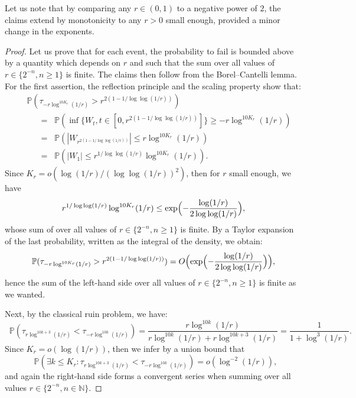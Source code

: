 \documentclass[british, a4paper,11pt]{article}
\numberwithin{equation}{section}
\theoremstyle{definition}
\renewcommand{\P}{\mathop{}\!\mathbb{P}}
\newcommand{\N}{\mathbb{N}}
\begin{document}
Let us note that by comparing any $r \in (0,1)$ to a negative power of $2$, the claims extend by monotonicity to any $r>0$ small enough, provided a minor change in the exponents.

\begin{proof}
Let us prove that for each event, the probability to fail is bounded above by a quantity which depends on $r$ and such that the sum over all values of $r \in \{2^{-n}, n \geq 1\}$ is finite. The claims then follow from the Borel--Cantelli lemma.
For the first assertion, the reflection principle and the scaling property show that:
\begin{align*}
&\P(\tau_{-r \log^{10 K_{r}}(1/r)} > r^{2(1-1/\log\log(1/r))})\\
& \qquad = \P(\inf\{W_t, t \in [0, r^{2(1-1/\log\log(1/r))}]\} \geq -r \log^{10 K_{r}}(1/r))
\\
& \qquad= \P(|W_{r^{2(1-1/\log\log(1/r))}}| \leq r \log^{10 K_{r}}(1/r)) 
\\
&\qquad= \P(|W_{1}| \leq r^{1/\log\log(1/r)} \log^{10 K_{r}}(1/r)) 
.\end{align*}
Since $K_r = o(\log(1/r)/(\log\log(1/r))^2)$, then for $r$ small enough, we have
\[r^{1/\log\log(1/r)} \log^{10 K_{r}}(1/r)
\leq \exp\Bigl(- \frac{\log(1/r)}{2 \log\log(1/r)}\Bigr)
,\]
whose sum of over all values of $r \in \{2^{-n}, n \geq 1\}$ is finite.
By a Taylor expansion of the last probability, written as the integral of the density, we obtain:
\[\P(\tau_{-r \log^{10 K_{r}}(1/r)} > r^{2(1-1/\log\log(1/r))})
= O\Bigl(\exp\Bigl(- \frac{\log(1/r)}{2 \log\log(1/r)}\Bigr)\Bigr)
,\]
hence the sum of the left-hand side over all values of $r \in \{2^{-n}, n \geq 1\}$ is finite as we wanted.

Next, by the classical ruin problem, we have:
\[\P(\tau_{r \log^{10k+3}(1/r)} < \tau_{-r \log^{10k}(1/r)})
= \frac{r \log^{10k}(1/r)}{r \log^{10k}(1/r) + r \log^{10k+3}(1/r)}
= \frac{1}{1 + \log^3(1/r)} 
.\]
Since $K_r = o(\log(1/r))$, then we infer by a union bound that 
\[\P(\exists k \leq K_r \colon \tau_{r \log^{10k+3}(1/r)} < \tau_{-r \log^{10k}(1/r)}) = o(\log^{-2}(1/r)),\]
and again the right-hand side forms a convergent series when summing over all values $r \in \{2^{-n}, n \in \N\}$.


\end{proof}
\end{document}
